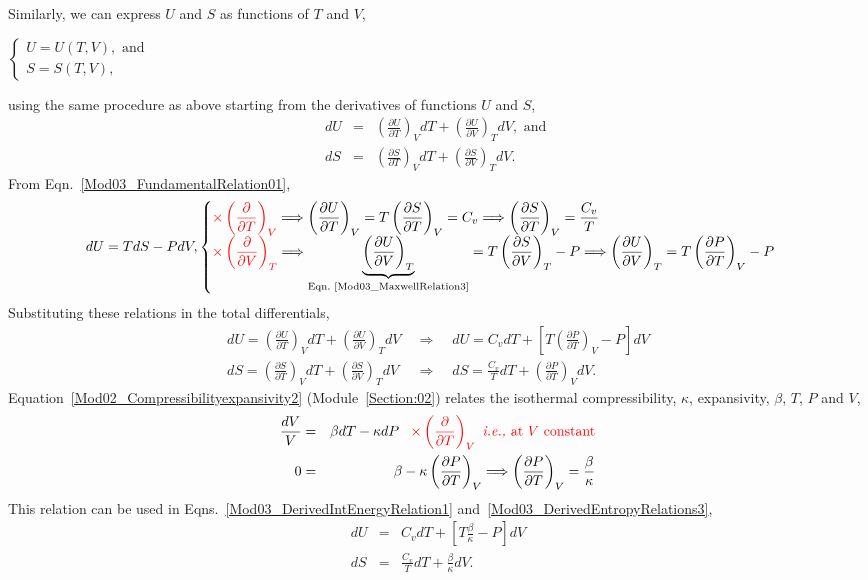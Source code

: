 \documentclass[12pts,a4paper,amsmath,amssymb,floatfix]{article}%
\newcommand{\frc}{\displaystyle\frac}
\newcommand{\red}{\textcolor{red}}
\newcommand{\ie}{{\it i.e., }}
\newcommand{\Partial}[3][error]{\left(\frc{\partial #1}{\partial #2}\right)_{#3}}
\begin{document}
Similarly, we can express $U$ and $S$ as functions of $T$ and $V$,
    \begin{center}
       $\begin{cases}
           U = U(T,V), \text{ and } \\
           S = S(T,V),
        \end{cases}$
    \end{center} 
using the same procedure as above starting from the derivatives of functions $U$ and $S$,
    \begin{eqnarray}
        dU &=& \Partial[U]{T}{V}dT + \Partial[U]{V}{T}dV, \text{ and } \nonumber \\
        dS &=& \Partial[S]{T}{V}dT + \Partial[S]{V}{T}dV. \nonumber
    \end{eqnarray} 
From Eqn.~\ref{Mod03_FundamentalRelation01}, 
    \begin{displaymath}
        dU = TdS - PdV,
        \begin{cases}
            \red{\times\Partial[]{T}{V}} \Longrightarrow \Partial[U]{T}{V} = T\Partial[S]{T}{V} = C_{v} \Longrightarrow  \Partial[S]{T}{V} = \frc{C_{v}}{T}\\
            \red{\times\Partial[]{V}{T}} \Longrightarrow \underbrace{\Partial[U]{V}{T}}_{\text{Eqn.~\ref{Mod03_MaxwellRelation3}}} = T\Partial[S]{V}{T} - P \Longrightarrow \Partial[U]{V}{T} = T\Partial[P]{T}{V}-P   \\
        \end{cases}
    \end{displaymath}
Substituting these relations in the total differentials,
    \begin{eqnarray}
        dU = \Partial[U]{T}{V}dT + \Partial[U]{V}{T}dV \;\;&\Longrightarrow&\;\; dU = C_{v}dT + \left[T\Partial[P]{T}{V}-P\right]dV\label{Mod03_DerivedIntEnergyRelation1} \\
        dS = \Partial[S]{T}{V}dT + \Partial[S]{V}{T}dV \;\;&\Longrightarrow&\;\; dS = \frc{C_{v}}{T}dT + \Partial[P]{T}{V}dV.\label{Mod03_DerivedEntropyRelations3}
    \end{eqnarray} 
Equation~\ref{Mod02_Compressibilityexpansivity2} (Module~\ref{Section:02}) relates the isothermal compressibility, $\kappa$, expansivity, $\beta$, $T$, $P$ and $V$,
     \begin{eqnarray}
        \frc{dV}{V} &=& \beta dT - \kappa dP \;\;\;\red{\times\Partial[]{T}{V} \nonumber \text{ \ie at }V\text{ constant}} \nonumber \\
            0       &=& \beta - \kappa\Partial[P]{T}{V} \Longrightarrow \Partial[P]{T}{V} = \frc{\beta}{\kappa} \nonumber
     \end{eqnarray}
This relation can be used in Eqns.~\ref{Mod03_DerivedIntEnergyRelation1} and~\ref{Mod03_DerivedEntropyRelations3},
     \begin{eqnarray}
        dU &=& C_{v}dT + \left[T\frc{\beta}{\kappa}-P\right]dV\label{Mod03_DerivedIntEnergyRelation2} \\
        dS &=& \frc{C_{v}}{T}dT + \frc{\beta}{\kappa}dV.\label{Mod03_DerivedEntropyRelations4}
     \end{eqnarray}
\end{document}
